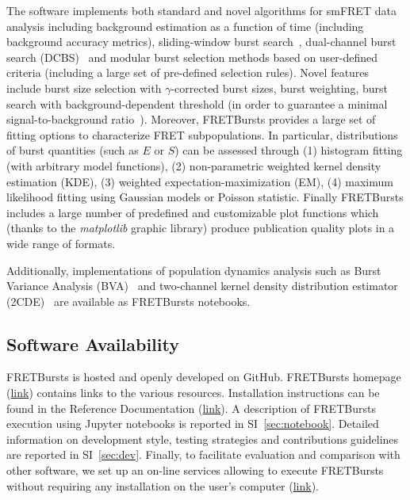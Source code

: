 \documentclass[10pt,letterpaper]{article}
\begin{document}
The software implements both standard and novel algorithms for smFRET data analysis
including background estimation as a function of time (including background accuracy
metrics), sliding-window burst search~\cite{Eggeling_1998},
dual-channel burst search (DCBS)~\cite{Nir_2006} and
modular burst selection methods based on user-defined criteria
(including a large set of pre-defined selection rules). Novel features include burst size
selection with $\gamma$-corrected burst sizes, burst weighting, burst search with
background-dependent threshold (in order to guarantee a minimal signal-to-background
ratio~\cite{Michalet_2012}).
Moreover, FRETBursts provides a large set of fitting options to characterize FRET subpopulations.
In particular, distributions of burst quantities (such as $E$ or $S$) can be assessed
through (1) histogram fitting (with arbitrary model functions),
(2) non-parametric weighted kernel density estimation (KDE), (3) weighted
expectation-maximization (EM), (4) maximum likelihood fitting using Gaussian models
or Poisson statistic. Finally FRETBursts includes a large number of
predefined and customizable plot functions which (thanks to the \textit{matplotlib}
graphic library) produce publication quality plots in a wide range of formats.

Additionally, implementations of population dynamics analysis such
as Burst Variance Analysis (BVA)~\cite{Torella_2011} and two-channel
kernel density distribution estimator (2CDE)~\cite{Tomov_2012}
are available as FRETBursts notebooks.

\subsection{Software Availability}
FRETBursts is hosted and openly developed on GitHub. FRETBursts homepage
(\href{http://tritemio.github.io/FRETBursts}{link})
contains links to the various resources. Installation instructions can be found in the
Reference Documentation (\href{http://fretbursts.readthedocs.org/en/latest/getting_started.html}{link}).
A description of FRETBursts execution using Jupyter notebooks is reported
in SI~\ref{sec:notebook}.
Detailed information on development style, testing strategies and
contributions guidelines are reported in SI~\ref{sec:dev}.
Finally, to facilitate evaluation and comparison with other software,
we set up an on-line services allowing to execute FRETBursts
without requiring any installation on the user's computer (\href{https://github.com/tritemio/FRETBursts_notebooks#run-online}{link}).
\end{document}
